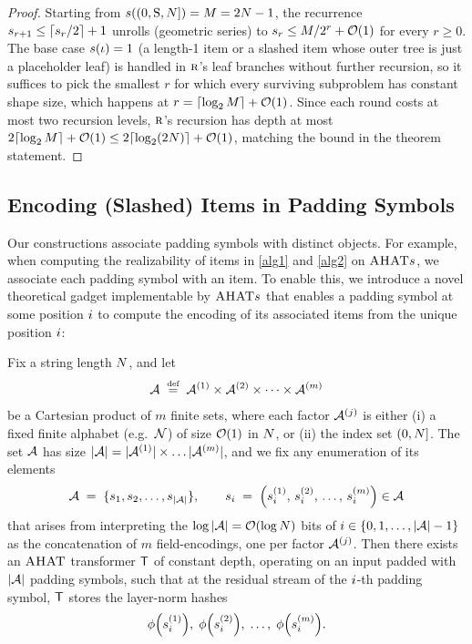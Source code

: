 \documentclass{article}
\begin{document}
\begin{proof}
    Starting from $s((0,{{ \mathrm{S}}},{{ N}}]) = M = 2{{ N}} - 1$, the recurrence $s_{r+1} \le \lceil s_r/2\rceil + 1$ unrolls (geometric series) to $s_r \le M/2^r + {{ \mathcal{O}}}(1)$ for every $r \ge 0$. The base case $s({{ \iota}}) = 1$ (a length-1 item or a slashed item whose outer tree is just a placeholder leaf) is handled in ${\textsc{r}}$'s leaf branches without further recursion, so it suffices to pick the smallest $r$ for which every surviving subproblem has constant shape size, which happens at $r = \lceil\log_{2} M\rceil + {{ \mathcal{O}}}(1)$.
    Since each round costs at most two recursion levels, ${\textsc{r}}$'s recursion has depth at most $2\lceil\log_2 M\rceil + {{ \mathcal{O}}}(1) \le 2\lceil\log_{2}(2{{ N}})\rceil + {{ \mathcal{O}}}(1)$, matching the bound in the theorem statement.
\end{proof}

\subsection{Encoding (Slashed) Items in Padding Symbols}
Our constructions associate padding symbols with distinct objects. 
For example, when computing the realizability of items in \cref{alg1} and \cref{alg2} on ${{{\textsc{AHAT}}}}s$, we associate each padding symbol with an item. 
To enable this, we introduce a novel theoretical gadget implementable by ${{{\textsc{AHAT}}}}s$ that enables a padding symbol at some position ${{ i}}$ to compute the encoding of its associated items from the unique position ${{ i}}$:
\begin{lemma}\label{lem:pos2enc}
    Fix a string length ${{ N}}$, and let
\[
    \aset \;\defeq\; \aset^{(1)} \times \aset^{(2)} \times \cdots \times \aset^{(m)}
\]
    be a Cartesian product of $m$ finite sets, where each factor ${{{{ \mathcal{A}}}}}^{(j)}$ is either (i) a fixed finite alphabet (e.g.\ ${{ \mathcal{N}}}$) of size ${{ \mathcal{O}}}(1)$ in ${{ N}}$, or (ii) the index set $(0,{{ N}}]$.
    The set ${{{{ \mathcal{A}}}}}$ has size $\asetsize=|\aset^{(1)}|\times\ldots|\aset^{(m)}|$, and we fix any enumeration of its elements
\[
    \aset \;=\; \set{\asetelem_1, \asetelem_2, \ldots, \asetelem_{\asetsize}},
    \qquad
    \asetelem_\idxi \;=\; \mleft(\asetelem^{(1)}_\idxi,\, \asetelem^{(2)}_\idxi,\, \ldots,\, \asetelem^{(m)}_\idxi\mright) \in \aset
\]
    that arises from interpreting the $\log \asetsize = \bigo(\log \idxn)$ bits of ${{ i}}\in{{\{ 0,1,\ldots,|{{{{ \mathcal{A}}}}}|-1 \}}}$ as the concatenation of $m$ field-encodings, one per factor ${{{{ \mathcal{A}}}}}^{(j)}$.
    Then there exists an ${{\textsc{AHAT}}}$ transformer $\tf$ of constant depth, operating on an input padded with $\asetsize$ padding symbols, such that at the residual stream of the ${{ i}}$-th padding symbol, $\tf$ stores the layer-norm hashes
\[
    \phi\mleft(\asetelem^{(1)}_\idxi\mright),\;
    \phi\mleft(\asetelem^{(2)}_\idxi\mright),\;
    \ldots,\;
    \phi\mleft(\asetelem^{(m)}_\idxi\mright).
\]
\end{lemma}
\end{document}
